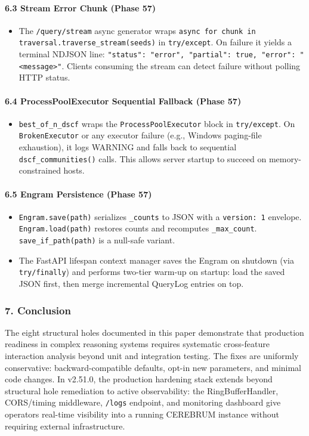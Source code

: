 \paragraph{6.3 Stream Error Chunk (Phase 57)}
\begin{itemize}
\item The \texttt{/query/stream} async generator wraps \texttt{async for chunk in traversal.traverse\_stream(seeds)} in \texttt{try/except}. On failure it yields a terminal NDJSON line: \texttt{{"status": "error", "partial": true, "error": "\textless message\textgreater "}}. Clients consuming the stream can detect failure without polling HTTP status.

\end{itemize}
\paragraph{6.4 ProcessPoolExecutor Sequential Fallback (Phase 57)}
\begin{itemize}
\item \texttt{best\_of\_n\_dscf} wraps the \texttt{ProcessPoolExecutor} block in \texttt{try/except}. On \texttt{BrokenExecutor} or any executor failure (e.g., Windows paging-file exhaustion), it logs WARNING and falls back to sequential \texttt{dscf\_communities()} calls. This allows server startup to succeed on memory-constrained hosts.

\end{itemize}
\paragraph{6.5 Engram Persistence (Phase 57)}
\begin{itemize}
\item \texttt{Engram.save(path)} serializes \texttt{\_counts} to JSON with a \texttt{version: 1} envelope. \texttt{Engram.load(path)} restores counts and recomputes \texttt{\_max\_count}. \texttt{save\_if\_path(path)} is a null-safe variant.
\item The FastAPI lifespan context manager saves the Engram on shutdown (via \texttt{try/finally}) and performs two-tier warm-up on startup: load the saved JSON first, then merge incremental QueryLog entries on top.

\end{itemize}
\subsubsection{7. Conclusion}
The eight structural holes documented in this paper demonstrate that production readiness in complex reasoning systems requires systematic cross-feature interaction analysis beyond unit and integration testing. The fixes are uniformly conse\-rvative: backward-compatible defaults, opt-in new parameters, and minimal code changes. In v2.51.0, the production hardening stack extends beyond structural hole remediation to active obser\-vability: the RingBufferHandler, CORS/timing middleware, \texttt{/logs} endpoint, and monitoring dashboard give operators real-time visibility into a running CEREBRUM instance without requiring external infra\-structure.

